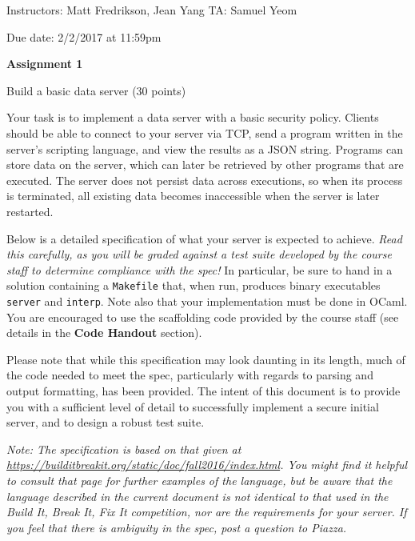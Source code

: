 \documentclass[11pt]{article}
\newcommand*{\stuname}{}
\newcommand*{\assignmentnumb}{1}
\begin{document}
\centerline{Instructors: Matt Fredrikson, Jean Yang \hfill TA: Samuel Yeom} 
\vspace{0.5ex}
Due date: 2/2/2017 at 11:59pm \\
\vspace{1.5ex}
\centerline{\Large\bf Assignment \assignmentnumb}
\vspace{0.5ex}
\centerline{\Large\bf \stuname}

\begin{problem}{Build a basic data server (30 points)}

Your task is to implement a data server with a basic security policy. Clients should be able to connect to your server via TCP, send a program written in the server's scripting language, and view the results as a JSON string. Programs can store data on the server, which can later be retrieved by other programs that are executed. The server does not persist data across executions, so when its process is terminated, all existing data becomes inaccessible when the server is later restarted.

Below is a detailed specification of what your server is expected to achieve. \emph{Read this carefully, as you will be graded against a test suite developed by the course staff to determine compliance with the spec!} In particular, be sure to hand in a solution containing a \texttt{Makefile} that, when run, produces binary executables \texttt{server} and \texttt{interp}. Note also that your implementation must be done in OCaml. You are encouraged to use the scaffolding code provided by the course staff (see details in the \textbf{Code Handout} section).

Please note that while this specification may look daunting in its length, much of the code needed to meet the spec, particularly with regards to parsing and output formatting, has been provided. The intent of this document is to provide you with a sufficient level of detail to successfully implement a secure initial server, and to design a robust test suite.

\emph{Note: The specification is based on that given at \url{https://builditbreakit.org/static/doc/fall2016/index.html}. You might find it helpful to consult that page for further examples of the language, but be aware that the language described in the current document is not identical to that used in the Build It, Break It, Fix It competition, nor are the requirements for your server. If you feel that there is ambiguity in the spec, post a question to Piazza.} 


\end{problem}
\end{document}
